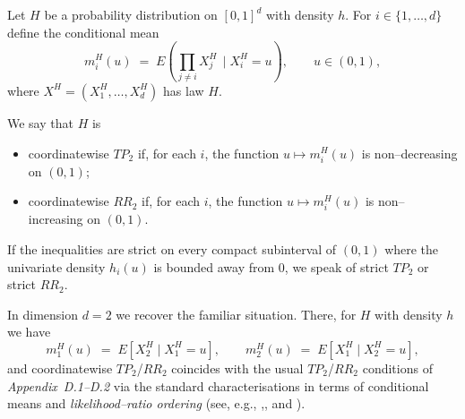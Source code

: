 \documentclass[onecolumn]{article}
\newtheorem{definition}[theorem]{Definition}
\let\olddefinition\definition
\let\endolddefinition\enddefinition
\renewenvironment{definition}{\olddefinition\normalfont}{\endolddefinition}
\begin{document}
\begin{definition}
\noindent \label{d-tp2-rr2} Let $H$ be a probability distribution on $%
[0,1]^{d}$ with density $h$. For $i\in \{1,\dots ,d\}$ define the
conditional mean 
\begin{equation}
m_{i}^{H}(u)\;=\;E(\prod_{j\neq i}X_{j}^{H}\,\mid X_{i}^{H}=u),\qquad u\in
(0,1),  \label{942}
\end{equation}%
where $X^{H}=(X_{1}^{H},\dots ,X_{d}^{H})$ has law $H$.

We say that $H$ is

\begin{itemize}
\item coordinatewise $TP_{2}$ if, for each $i$, the function $u\mapsto
m_{i}^{H}(u)$ is non--decreasing on $(0,1)$;

\item coordinatewise $RR_{2}$ if, for each $i$, the function $u\mapsto
m_{i}^{H}(u)$ is non--increasing on $(0,1)$.
\end{itemize}

If the inequalities are strict on every compact subinterval of $(0,1)$ where
the univariate density $h_{i}(u)$ is bounded away from $0$, we speak of
strict $TP_{2}$ or strict $RR_{2}$.
\end{definition}

In dimension $d=2$ we recover the familiar situation. There, for $H$ with
density $h$ we have 
\begin{equation}
m_{1}^{H}(u)\;=\;E[X_{2}^{H}\mid X_{1}^{H}=u],\qquad
m_{2}^{H}(u)\;=\;E[X_{1}^{H}\mid X_{2}^{H}=u],  \label{943}
\end{equation}%
and coordinatewise $TP_{2}$/$RR_{2}$ coincides with the usual $TP_{2}$/$%
RR_{2}$ conditions of \textit{Appendix~D.1--D.2} via the standard
characterisations in terms of conditional means and \textit{%
likelihood--ratio ordering} (see, e.g., \cite{[32]},\cite{[28]}, and \cite%
{[24]}).
\end{document}
